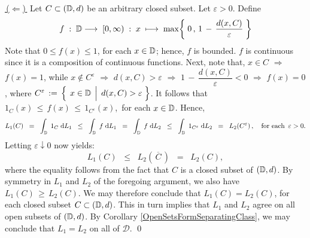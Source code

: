 \vskip 0.5cm
\noindent
\underline{\,($\Longleftarrow$)\,}\;\;
Let $C \subset (\mathbb{D},d)$ be an arbitrary closed subset.
Let $\varepsilon > 0$. Define 
\begin{equation*}
f
\; : \; \mathbb{D} \longrightarrow \; [0,\infty) \; : \;
x \; \longmapsto\;  \max\!\left\{\; 0\,,\, 1\,-\,\dfrac{d(x,C)}{\varepsilon} \;\right\}
\end{equation*}
Note that $0 \leq f(x) \leq 1$, for each $x \in \mathbb{D}$; hence, $f$ is bounded.
$f$ is continuous since it is a composition of continuous functions.
Next, note that, $x \in C$ $\Longrightarrow$ $f(x) = 1$, while 
$x \notin C^{\varepsilon}$
\;$\Longrightarrow$\; $d(x,C) > \varepsilon$
\;$\Longrightarrow$\; $1\,-\,\dfrac{d(x,C)}{\varepsilon} < 0$
\;$\Longrightarrow$\; $f(x) = 0$,
where $C^{\varepsilon} \,:=\, \left\{\;\left.x \overset{{\color{white}.}}{\in} \D \;\,\right\vert\; d(x,C) > \varepsilon\;\right\}$.
It follows that \,$1_{C}(x) \,\leq\, f(x) \,\leq\, 1_{C^{\varepsilon}}(x)$,\, for each $x\in\mathbb{D}$.
Hence,
\begin{equation*}
L_{1}(C)
\;\; = \;\;
	\int_{\mathbb{D}}\;1_{C}\;\textnormal{d} L_{1}
\;\; \leq \;\;
	\int_{\mathbb{D}}\;f\;\textnormal{d} L_{1}
\;\; = \;\;
	\int_{\mathbb{D}}\;f\;\textnormal{d} L_{2}
\;\; \leq \;\;
	\int_{\mathbb{D}}\;1_{C^{\varepsilon}}\;\textnormal{d} L_{2}
\;\; = \;\;
	L_{2}(C^{\varepsilon})\,,
	\quad
	\textnormal{for each \,$\varepsilon > 0$}.
\end{equation*}
Letting $\varepsilon \downarrow 0$ now yields:
\begin{equation*}
L_{1}(C) \;\; \leq \;\; L_{2}\!\left(\,\overline{C}\,\right) \;\; = \;\; L_{2}(C),
\end{equation*}
where the equality follows from the fact that $C$ is a closed subset of $(\mathbb{D},d)$.
By symmetry in $L_{1}$ and $L_{2}$ of the foregoing argument,
we also have $L_{1}(C) \,\geq\, L_{2}(C)$.
We may therefore conclude that $L_{1}(C) = L_{2}(C)$,
for each closed subset $C \subset (\mathbb{D},d)$.
This in turn implies that $L_{1}$ and $L_{2}$ agree on all open subsets of $(\mathbb{D},d)$.
By Corollary \ref{OpenSetsFormSeparatingClass},
we may conclude that $L_{1} = L_{2}$ on all of $\mathcal{D}$.
\qed


